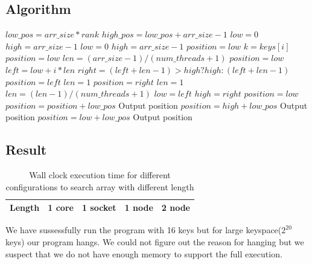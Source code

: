 \documentclass{article}
\begin{document}
\subsection{Algorithm}
\begin{algorithmic}[1]
 \label{alg:p3}
\State $low\_pos = arr\_size * rank$
\State $high\_pos = low\_pos + arr\_size - 1$
\State $low = 0$
\State $high = arr\_size - 1$
\State $low = 0$
\State $high = arr\_size - 1$
\State $position=low$
\State $k = keys[i]$
\State $position = low$
\EndIf
\EndParFor
\Else
\State $len = (arr\_size - 1)/(num\_threads + 1)$
\State $position = low$
\State $left = low + i * len$
\State $right = (left + len - 1) > high ? high : (left + len - 1)$
\State $position=left$
\State $len = 1$
\State $position=right$
\State $len=1$
\Else
{}
\State $len=(len-1)/(num\_threads + 1)$
\State $low = left$
\State $high = right$
\State $position = low$
\EndIf
\EndIf
\EndParFor
\EndWhile
\EndIf
\State $position=position+low\_pos$
\State Output position
\State $position = high + low\_pos$
\State Output position
\Else
{}
\State $position = low + low\_pos$
\State Output position
\EndIf
\EndIf
\EndFor
\EndFunction
\end{algorithmic}

\subsection{Result}
\begin{table}[h]
  \centering
  \begin{tabular}{|c|c|c|c|c|}
    \hline
    Length & 1 core & 1 socket & 1 node & 2 node \\
    \hline
    \hline
  \end{tabular}
  \caption{Wall clock execution time for different configurations to
    search array with different length}
  \label{table:p3}
\end{table}

We have sussessfully run the program with 16 keys but for large
keyspace($2^{20}$ keys) our program hangs. We could not figure out the
reason for hanging but we suspect that we do not have enough memory to
support the full execution. 
\end{document}

